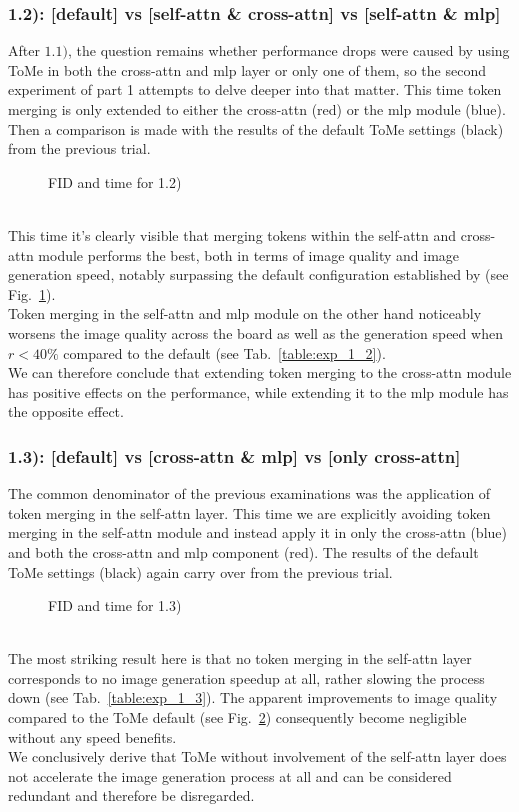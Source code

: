 \subsubsection*{1.2): [default] vs [self-attn \& cross-attn] vs [self-attn \& mlp]}
After \(1.1)\), the question remains whether performance drops were caused by using ToMe in both the cross-attn and mlp layer or only one of them, so the second experiment of part 1 attempts to delve deeper into that matter. This time token merging is only extended to either the cross-attn (red) or the mlp module (blue). Then a comparison is made with the results of the default ToMe settings (black) from the previous trial.
\begin{figure}[!htb]
    
    
\caption{FID and time for 1.2)}
\label{fig:exp_1_2}
\end{figure}\\
This time it's clearly visible that merging tokens within the self-attn and cross-attn module performs the best, both in terms of image quality and image generation speed, notably surpassing the default configuration established by \cite{bolya2023tomesd} (see Fig.~\ref{fig:exp_1_2}).\\
Token merging in the self-attn and mlp module on the other hand noticeably worsens the image quality across the board as well as the generation speed when $r<40\%$ compared to the default (see Tab.~\ref{table:exp_1_2}).\\
We can therefore conclude that extending token merging to the cross-attn module has positive effects on the performance, while extending it to the mlp module has the opposite effect.



\subsubsection*{1.3): [default] vs [cross-attn \& mlp] vs [only cross-attn]}
The common denominator of the previous examinations was the application of token merging in the self-attn layer. This time we are explicitly avoiding token merging in the self-attn module and instead apply it in only the cross-attn (blue) and both the cross-attn and mlp component (red).
The results of the default ToMe settings (black) again carry over from the previous trial.
\begin{figure}[!htb]
    
    
\caption{FID and time for 1.3)}
\label{fig:exp_1_3}
\end{figure}\\
The most striking result here is that no token merging in the self-attn layer corresponds to no image generation speedup at all, rather slowing the process down (see Tab.~\ref{table:exp_1_3}). 
The apparent improvements to image quality compared to the ToMe default (see Fig.~\ref{fig:exp_1_3}) consequently become negligible without any speed benefits.\\
We conclusively derive that ToMe without involvement of the self-attn layer does not accelerate the image generation process at all and can be considered redundant and therefore be disregarded.




